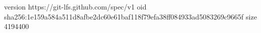 version https://git-lfs.github.com/spec/v1
oid sha256:1e159a584a511d8afbe2dc60e61baf118f79efa38ff084933ad5083269c9665f
size 4194400
